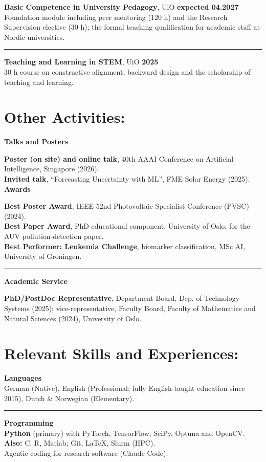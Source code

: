\documentclass[margin]{res}
\begin{document}
\begin{resume}
{\bf Basic Competence in University Pedagogy}, UiO \hfill {\bf expected 04.2027}\\
Foundation module including peer mentoring (120 h) and the Research Supervision elective (30 h); the formal teaching qualification for academic staff at Nordic universities.

\vspace{0.2cm}
\hrule
{\bf Teaching and Learning in STEM}, UiO \hfill {\bf 2025}\\
30 h course on constructive alignment, backward design and the scholarship of teaching and learning.

\section{Other Activities:}
{\bf Talks and Posters}

    \textbf{Poster (on site) and online talk}, 40th AAAI Conference on Artificial Intelligence, Singapore (2026).\\
    \textbf{Invited talk}, ``Forecasting Uncertainty with ML'', FME Solar Energy (2025).\\\vspace{0.2cm}
\newpage %
{\bf Awards}

    \textbf{Best Poster Award}, IEEE 52nd Photovoltaic Specialist Conference (PVSC) (2024).\\
    \textbf{Best Paper Award}, PhD educational component, University of Oslo, for the AUV pollution-detection paper.\\
    \textbf{Best Performer: Leukemia Challenge}, biomarker classification, MSc AI, University of Groningen.\\\vspace{0.2cm}
\hrule

{\bf Academic Service}

    \textbf{PhD/PostDoc Representative}, Department Board, Dep. of Technology Systems (2025); vice-representative, Faculty Board, Faculty of Mathematics and Natural Sciences (2024), University of Oslo.\\

\section{Relevant Skills and Experiences:}
{\bf Languages}\\
German (Native), English (Professional; fully English-taught education since 2015), Dutch \& Norwegian (Elementary).\\
\vspace{0.2cm}
\hrule
{\bf Programming} \\
\textbf{Python} (primary) with PyTorch, TensorFlow, SciPy, Optuna and OpenCV.\\
\textbf{Also:} C, R, Matlab; Git, LaTeX, Slurm (HPC).\\
Agentic coding for research software (Claude Code).

\end{resume}
\end{document}
